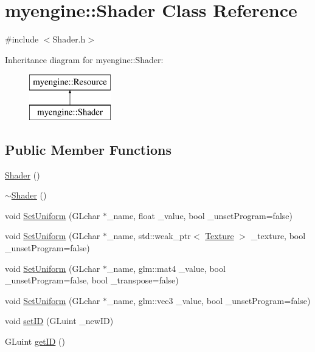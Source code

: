 \hypertarget{classmyengine_1_1_shader}{}\section{myengine\+:\+:Shader Class Reference}
\label{classmyengine_1_1_shader}


{\ttfamily \#include $<$Shader.\+h$>$}

Inheritance diagram for myengine\+:\+:Shader\+:\begin{figure}[H]
\begin{center}
\leavevmode
\includegraphics[height=2.000000cm]{classmyengine_1_1_shader}
\end{center}
\end{figure}
\subsection*{Public Member Functions}
\begin{DoxyCompactItemize}
\item 
\hyperlink{classmyengine_1_1_shader_aee2f3e6536000e55269b4f3a2f9c478f}{Shader} ()
\item 
\hyperlink{classmyengine_1_1_shader_a857cbbb1aa3eb09212cadd9d5bd5edf9}{$\sim$\+Shader} ()
\item 
void \hyperlink{classmyengine_1_1_shader_ac73d2e97c8afd63cc0b826f596dd330e}{Set\+Uniform} (G\+Lchar $\ast$\+\_\+name, float \+\_\+value, bool \+\_\+unset\+Program=false)
\item 
void \hyperlink{classmyengine_1_1_shader_a8f90d7986843c6e462f51b574fb2494a}{Set\+Uniform} (G\+Lchar $\ast$\+\_\+name, std\+::weak\+\_\+ptr$<$ \hyperlink{classmyengine_1_1_texture}{Texture} $>$ \+\_\+texture, bool \+\_\+unset\+Program=false)
\item 
void \hyperlink{classmyengine_1_1_shader_a3a1a27a7aaa38dad35d2505e4b99380f}{Set\+Uniform} (G\+Lchar $\ast$\+\_\+name, glm\+::mat4 \+\_\+value, bool \+\_\+unset\+Program=false, bool \+\_\+transpose=false)
\item 
void \hyperlink{classmyengine_1_1_shader_a63e19986143ad7857d270e22ea0a4ff0}{Set\+Uniform} (G\+Lchar $\ast$\+\_\+name, glm\+::vec3 \+\_\+value, bool \+\_\+unset\+Program=false)
\item 
void \hyperlink{classmyengine_1_1_shader_a9753467c609016a7c1c7a1156da2533f}{set\+ID} (G\+Luint \+\_\+new\+ID)
\item 
G\+Luint \hyperlink{classmyengine_1_1_shader_a2849648cdf31caa5c0ba50a639091387}{get\+ID} ()
\end{DoxyCompactItemize}
